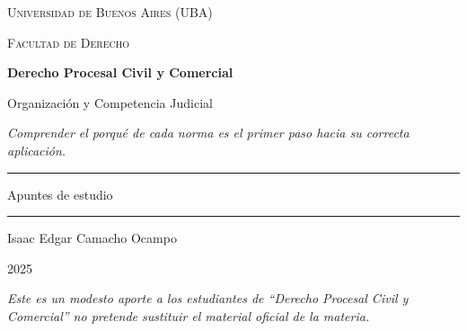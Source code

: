 \documentclass[12pt,oneside]{book}
\newcommand{\universidad}{Universidad de Buenos Aires (UBA)}
\newcommand{\facultad}{Facultad de Derecho}
\newcommand{\materia}{Derecho Procesal Civil y Comercial}
\newcommand{\titulo}{Organización y Competencia Judicial}
\newcommand{\autor}{Isaac Edgar Camacho Ocampo}
\newcommand{\anio}{2025}
\begin{document}
\begin{titlepage}

\thispagestyle{empty}

\begin{center}

\vspace*{1cm}

{\large \textsc{\universidad}}

\vspace{0.2cm}

{\large \textsc{\facultad}}

\vspace{3cm}

{\Huge \textbf{\materia}}

\vspace{1cm}

{\LARGE \titulo}

\vspace{0.8cm}

\textit{Comprender el porqué de cada norma es el primer paso hacia su correcta aplicación.}

\vspace{1.2cm}

\rule{0.70\textwidth}{0.5pt}

\vspace{0.5cm}

{\large Apuntes de estudio}

\vspace{0.5cm}

\rule{0.70\textwidth}{0.5pt}

\vfill

{\large \autor}

\vspace{0.3cm}

{\large \anio}

\end{center}

\vfill

\begin{flushleft}
\textit{Este es un modesto aporte a los estudiantes de ``Derecho Procesal Civil y Comercial'' no pretende sustituir el material oficial de la materia.}
\end{flushleft}

\end{titlepage}

\tableofcontents
\end{document}
